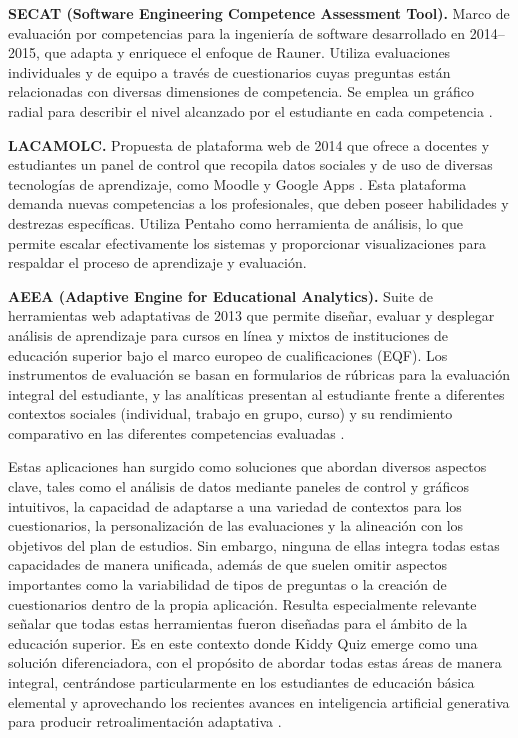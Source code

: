 \textbf{SECAT (Software Engineering Competence Assessment Tool).} Marco de evaluación por competencias para la ingeniería de software desarrollado en 2014--2015, que adapta y enriquece el enfoque de Rauner. Utiliza evaluaciones individuales y de equipo a través de cuestionarios cuyas preguntas están relacionadas con diversas dimensiones de competencia. Se emplea un gráfico radial para describir el nivel alcanzado por el estudiante en cada competencia \cite{ref11_secat,ref22_secat_engineering}.

\textbf{LACAMOLC.} Propuesta de plataforma web de 2014 que ofrece a docentes y estudiantes un panel de control que recopila datos sociales y de uso de diversas tecnologías de aprendizaje, como Moodle y Google Apps \cite{ref23_lacamolc}. Esta plataforma demanda nuevas competencias a los profesionales, que deben poseer habilidades y destrezas específicas. Utiliza Pentaho como herramienta de análisis, lo que permite escalar efectivamente los sistemas y proporcionar visualizaciones para respaldar el proceso de aprendizaje y evaluación.

\textbf{AEEA (Adaptive Engine for Educational Analytics).} Suite de herramientas web adaptativas de 2013 que permite diseñar, evaluar y desplegar análisis de aprendizaje para cursos en línea y mixtos de instituciones de educación superior bajo el marco europeo de cualificaciones (EQF). Los instrumentos de evaluación se basan en formularios de rúbricas para la evaluación integral del estudiante, y las analíticas presentan al estudiante frente a diferentes contextos sociales (individual, trabajo en grupo, curso) y su rendimiento comparativo en las diferentes competencias evaluadas \cite{ref24_aeea}.

Estas aplicaciones han surgido como soluciones que abordan diversos aspectos clave, tales como el análisis de datos mediante paneles de control y gráficos intuitivos, la capacidad de adaptarse a una variedad de contextos para los cuestionarios, la personalización de las evaluaciones y la alineación con los objetivos del plan de estudios. Sin embargo, ninguna de ellas integra todas estas capacidades de manera unificada, además de que suelen omitir aspectos importantes como la variabilidad de tipos de preguntas o la creación de cuestionarios dentro de la propia aplicación. Resulta especialmente relevante señalar que todas estas herramientas fueron diseñadas para el ámbito de la educación superior. Es en este contexto donde Kiddy Quiz emerge como una solución diferenciadora, con el propósito de abordar todas estas áreas de manera integral, centrándose particularmente en los estudiantes de educación básica elemental y aprovechando los recientes avances en inteligencia artificial generativa para producir retroalimentación adaptativa \cite{ref46_app_educativas}.
